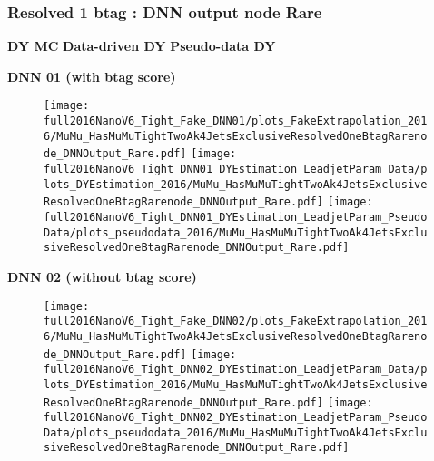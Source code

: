 \documentclass[9pt]{beamer}
\begin{document}
\begin{frame}
    \frametitle{Resolved 1 btag : DNN output node Rare}
    \hspace{2cm} \textbf{DY MC} \hspace{1.9cm} \textbf{Data-driven DY} \hspace{1cm} \textbf{Pseudo-data DY}
    \begin{center}
        \textbf{DNN 01 (with btag score)}
    \end{center}
	\begin{figure}
		\texttt{[image: full2016NanoV6\_Tight\_Fake\_DNN01/plots\_FakeExtrapolation\_2016/MuMu\_HasMuMuTightTwoAk4JetsExclusiveResolvedOneBtagRarenode\_DNNOutput\_Rare.pdf]}
		\texttt{[image: full2016NanoV6\_Tight\_DNN01\_DYEstimation\_LeadjetParam\_Data/plots\_DYEstimation\_2016/MuMu\_HasMuMuTightTwoAk4JetsExclusiveResolvedOneBtagRarenode\_DNNOutput\_Rare.pdf]}
		\texttt{[image: full2016NanoV6\_Tight\_DNN01\_DYEstimation\_LeadjetParam\_PseudoData/plots\_pseudodata\_2016/MuMu\_HasMuMuTightTwoAk4JetsExclusiveResolvedOneBtagRarenode\_DNNOutput\_Rare.pdf]}
	\end{figure}
    \begin{center}
        \textbf{DNN 02 (without btag score)}
    \end{center}
	\begin{figure}
		\texttt{[image: full2016NanoV6\_Tight\_Fake\_DNN02/plots\_FakeExtrapolation\_2016/MuMu\_HasMuMuTightTwoAk4JetsExclusiveResolvedOneBtagRarenode\_DNNOutput\_Rare.pdf]}
		\texttt{[image: full2016NanoV6\_Tight\_DNN02\_DYEstimation\_LeadjetParam\_Data/plots\_DYEstimation\_2016/MuMu\_HasMuMuTightTwoAk4JetsExclusiveResolvedOneBtagRarenode\_DNNOutput\_Rare.pdf]}
		\texttt{[image: full2016NanoV6\_Tight\_DNN02\_DYEstimation\_LeadjetParam\_PseudoData/plots\_pseudodata\_2016/MuMu\_HasMuMuTightTwoAk4JetsExclusiveResolvedOneBtagRarenode\_DNNOutput\_Rare.pdf]}
	\end{figure}
\end{frame}
\end{document}
